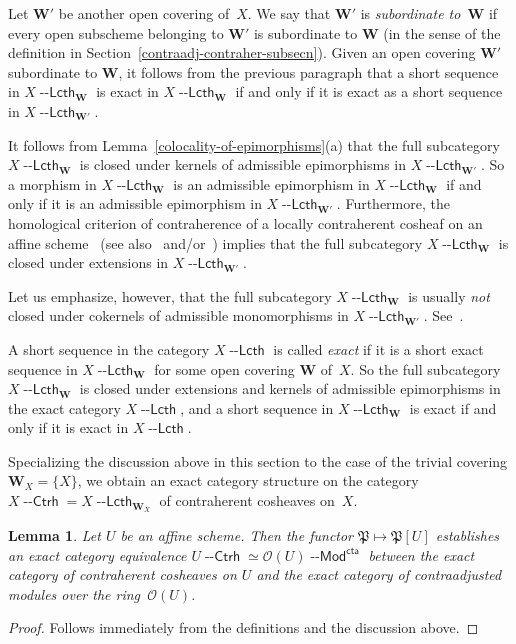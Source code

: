 \documentclass[12pt,a4paper]{amsart}
\newcommand{\+}{\nobreakdash-}
\renewcommand{\:}{\colon}
\newcommand{\Modl}{{\operatorname{\mathsf{--Mod}}}}
\newcommand{\Ctrh}{{\operatorname{\mathsf{--Ctrh}}}}
\newcommand{\Lcth}{{\operatorname{\mathsf{--Lcth}}}}
\newcommand{\cta}{\mathsf{cta}}
\newcommand{\bW}{\mathbf W}
\newcommand{\cO}{\mathcal O}
\newcommand{\fP}{\mathfrak P}
\theoremstyle{plain}
\newtheorem{lem}[thm]{Lemma}
\theoremstyle{definition}
\begin{document}
 Let $\bW'$ be another open covering of~$X$.
 We say that $\bW'$ is \emph{subordinate to\/~$\bW$} if every open
subscheme belonging to $\bW'$ is subordinate to $\bW$ (in the sense
of the definition in Section~\ref{contraadj-contraher-subsecn}).
 Given an open covering $\bW'$ subordinate to $\bW$, it follows
from the previous paragraph that a short sequence in $X\Lcth_\bW$
is exact in $X\Lcth_\bW$ if and only if it is exact as a short
sequence in $X\Lcth_{\bW'}$.

 It follows from Lemma~\ref{colocality-of-epimorphisms}(a) that
the full subcategory $X\Lcth_\bW$ is closed under kernels of
admissible epimorphisms in $X\Lcth_{\bW'}$.
 So a morphism in $X\Lcth_\bW$ is an admissible epimorphism in
$X\Lcth_\bW$ if and only if it is an admissible epimorphism in
$X\Lcth_{\bW'}$.
 Furthermore, the homological criterion of contraherence of
a locally contraherent cosheaf on an affine
scheme~\cite[Lemma~3.2.2]{Pcosh} (see also~\cite[Corollary~4.6.1]{Pcosh}
and/or~\cite[Proposition~3.6.1]{Pform}) implies that the full
subcategory $X\Lcth_\bW$ is closed under extensions in $X\Lcth_{\bW'}$.

 Let us emphasize, however, that the full subcategory $X\Lcth_\bW$
is usually \emph{not} closed under cokernels of admissible
monomorphisms in $X\Lcth_{\bW'}$.
 See~\cite[Example~3.2.1]{Pcosh}.

 A short sequence in the category $X\Lcth$ is called \emph{exact}
if it is a short exact sequence in $X\Lcth_\bW$ for some open
covering $\bW$ of~$X$.
 So the full subcategory $X\Lcth_\bW$ is closed under extensions
and kernels of admissible epimorphisms in the exact category
$X\Lcth$, and a short sequence in $X\Lcth_\bW$ is exact if and only
if it is exact in $X\Lcth$.

 Specializing the discussion above in this section to the case of
the trivial covering $\bW_X=\{X\}$, we obtain an exact category
structure on the category $X\Ctrh=X\Lcth_{\bW_X}$ of contraherent
cosheaves on~$X$.

\begin{lem} \label{ctrh-cosheaves-on-affine-scheme}
 Let $U$ be an affine scheme.
 Then the functor\/ $\fP\longmapsto\fP[U]$ establishes an exact
category equivalence $U\Ctrh\simeq\cO(U)\Modl^\cta$ between
the exact category of contraherent cosheaves on $U$ and the exact
category of contraadjusted modules over the ring\/~$\cO(U)$.
\end{lem}

\begin{proof}
 Follows immediately from the definitions and the discussion above.
\end{proof}
\end{document}

